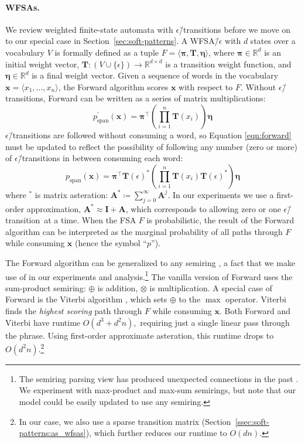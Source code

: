 \documentclass[11pt,a4paper]{article}
\renewcommand{\cite}[1]{\citep{#1}}
\newcommand{\secref}[1]{Section~\ref{sec:#1}}
\newcommand{\subsecref}[1]{Section~\ref{ssec:#1}}
\newcommand{\epstrans}{$\epsilon$\=/transition} %
\newcommand{\tensor}[1]{\mathbf{#1}}
\newcommand{\seq}[1]{\bm{#1}}
\newcommand{\R}{\mathbb{R}}
\begin{document}
\paragraph{WFSAs.}
We review weighted finite-state automata with
\epstrans s before we move on to our special case in \secref{soft-patterns}.
A WFSA\=/$\epsilon$ with $d$ states over a vocabulary $V$ is formally defined as a 
tuple $F = \langle \tensor{\pi}, \tensor{T}, \tensor{\eta} \rangle$, where
$\tensor{\pi} \in \R^{d}$ is an initial weight vector, $\tensor{T} : (V \cup \{\epsilon\}) \rightarrow \R^{d \times d}$ is a transition weight function, and $\tensor{\eta} \in \R^{d}$ is a final weight vector.
Given a sequence of words in the vocabulary $\seq{x} = \langle x_1, \ldots, x_n \rangle$,
the Forward algorithm \cite{baum_statistical_1966} scores $\seq{x}$ with respect to $F$.
Without \epstrans s, Forward can be written as a series of matrix multiplications:
\begin{equation}
\label{eqn:forward}
p_{\text{span}}^{\prime}(\seq{x}) =
  \tensor{\pi}^\top
  \left(\prod_{i=1}^n{\tensor{T}(x_i) }\right)
  \tensor{\eta}
\end{equation}
\epstrans s are followed without consuming a word, so Equation \ref{eqn:forward} must be
updated to reflect the possibility of following any number (zero or more) of
\epstrans s in between consuming each word:\begin{equation}
\label{eqn:forward_eps}
p_{\text{span}}(\seq{x}) =
  \tensor{\pi}^\top \tensor{T}(\epsilon)^*
    \left(\prod_{i=1}^n{
      \tensor{T}(x_i) \tensor{T}(\epsilon)^*
    }\right)
    \tensor{\eta}
\end{equation}
where $^*$ is matrix asteration: $\mathbf{A}^* \coloneqq \sum_{j=0}^\infty{\mathbf{A}^j}$.
In our experiments we use a first-order approximation,
$\mathbf{A}^* \approx \mathbf{I} + \mathbf{A}$, which corresponds to allowing zero or one \epstrans\ at a time.
When the FSA $F$ is probabilistic, the result of the Forward algorithm
can be interpreted as the marginal probability of all paths
through $F$ while consuming $\seq{x}$ (hence  the symbol ``$p$'').

The Forward algorithm can be generalized to any semiring \citep{eisner_parameter_2002}, a fact
that we make use of in our experiments and analysis.\footnote{The semiring parsing view \cite{goodman_semiring_1999} has produced unexpected connections in the past
\cite{eisner_inside_2016}.
We experiment with max-product and max-sum semirings, but note that
our model could be easily updated to use any semiring.
}
The vanilla version of Forward uses the sum-product semiring: $\oplus$
is addition, $\otimes$ is multiplication.
A special case of Forward  is the Viterbi algorithm
\cite{viterbi_error_1967}, which sets $\oplus$
to the $\max$ operator. Viterbi finds the \emph{highest scoring} path
through $F$ while consuming $\seq{x}$.
Both Forward and Viterbi have runtime $O(d^3 + d^2 n),$
requiring just a single linear pass through the phrase. 
Using first-order approximate asteration, this runtime drops to $O(d^2 n)$.\footnote{In our case, we also use a sparse transition matrix (\subsecref{soft-patterns:as_wfsas}), which further reduces our runtime to $O(dn)$.}
\end{document}
